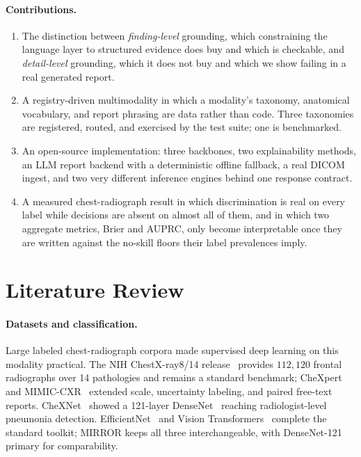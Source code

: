 \documentclass[10pt,twocolumn]{article}
\begin{document}
\paragraph{Contributions.}
\begin{enumerate}[leftmargin=1.3em,itemsep=1pt,topsep=2pt]
  \item The distinction between \emph{finding-level} grounding, which constraining
  the language layer to structured evidence does buy and which is checkable, and
  \emph{detail-level} grounding, which it does not buy and which we show failing
  in a real generated report.
  \item A registry-driven multimodality in which a modality's taxonomy, anatomical
  vocabulary, and report phrasing are data rather than code. Three taxonomies are
  registered, routed, and exercised by the test suite; one is benchmarked.
  \item An open-source implementation: three backbones, two explainability
  methods, an LLM report backend with a deterministic offline fallback, a real
  DICOM ingest, and two very different inference engines behind one response
  contract.
  \item A measured chest-radiograph result in which discrimination is real on
  every label while decisions are absent on almost all of them, and in which two
  aggregate metrics, Brier and AUPRC, only become interpretable once they are
  written against the no-skill floors their label prevalences imply.
\end{enumerate}

\section{Literature Review}
\label{sec:litreview}

\paragraph{Datasets and classification.} Large labeled chest-radiograph corpora
made supervised deep learning on this modality practical. The NIH ChestX-ray8/14
release~\cite{wang2017chestxray} provides $112{,}120$ frontal radiographs over 14
pathologies and remains a standard benchmark; CheXpert~\cite{irvin2019chexpert}
and MIMIC-CXR~\cite{johnson2019mimiccxr} extended scale, uncertainty labeling, and
paired free-text reports. CheXNet~\cite{rajpurkar2017chexnet} showed a 121-layer
DenseNet~\cite{huang2017densenet} reaching radiologist-level pneumonia detection.
EfficientNet~\cite{tan2019efficientnet} and Vision
Transformers~\cite{dosovitskiy2021vit} complete the standard toolkit; MIRROR keeps
all three interchangeable, with DenseNet-121 primary for comparability.
\end{document}
